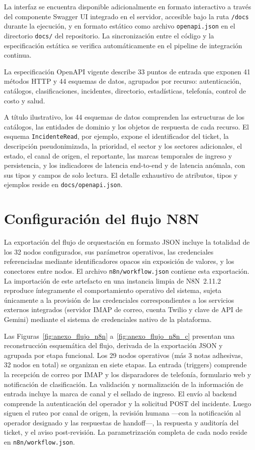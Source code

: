 La interfaz se encuentra disponible adicionalmente en formato interactivo a través del componente Swagger UI integrado en el servidor, accesible bajo la ruta \texttt{/docs} durante la ejecución, y en formato estático como archivo \texttt{openapi.json} en el directorio \texttt{docs/} del repositorio. La sincronización entre el código y la especificación estática se verifica automáticamente en el pipeline de integración continua.

La especificación OpenAPI vigente describe 33 puntos de entrada que exponen 41 métodos HTTP y 44 esquemas de datos, agrupados por recurso: autenticación, catálogos, clasificaciones, incidentes, directorio, estadísticas, telefonía, control de costo y salud.

A título ilustrativo, los 44 esquemas de datos comprenden las estructuras de los catálogos, las entidades de dominio y los objetos de respuesta de cada recurso. El esquema \texttt{IncidenteRead}, por ejemplo, expone el identificador del ticket, la descripción pseudonimizada, la prioridad, el sector y los sectores adicionales, el estado, el canal de origen, el reportante, las marcas temporales de ingreso y persistencia, y los indicadores de latencia end-to-end y de latencia anómala, con sus tipos y campos de solo lectura. El detalle exhaustivo de atributos, tipos y ejemplos reside en \texttt{docs/openapi.json}.

\section{Configuración del flujo N8N}\label{sec:anexo-flujo-n8n}

La exportación del flujo de orquestación en formato JSON incluye la totalidad de los 32 nodos configurados, sus parámetros operativos, las credenciales referenciadas mediante identificadores opacos sin exposición de valores, y los conectores entre nodos. El archivo \texttt{n8n/workflow.json} contiene esta exportación. La importación de este artefacto en una instancia limpia de N8N~2.11.2 reproduce íntegramente el comportamiento operativo del sistema, sujeta únicamente a la provisión de las credenciales correspondientes a los servicios externos integrados (servidor IMAP de correo, cuenta Twilio y clave de API de Gemini) mediante el sistema de credenciales nativo de la plataforma.

Las Figuras~\ref{fig:anexo_flujo_n8n} a~\ref{fig:anexo_flujo_n8n_c} presentan una reconstrucción esquemática del flujo, derivada de la exportación JSON y agrupada por etapa funcional. Los 29 nodos operativos (más 3 notas adhesivas, 32 nodos en total) se organizan en siete etapas. La entrada (triggers) comprende la recepción de correo por IMAP y los disparadores de telefonía, formulario web y notificación de clasificación. La validación y normalización de la información de entrada incluye la marca de canal y el sellado de ingreso. El envío al backend comprende la autenticación del operador y la solicitud POST del incidente. Luego siguen el ruteo por canal de origen, la revisión humana ---con la notificación al operador designado y las respuestas de handoff---, la respuesta y auditoría del ticket, y el aviso post-revisión. La parametrización completa de cada nodo reside en \texttt{n8n/workflow.json}.

